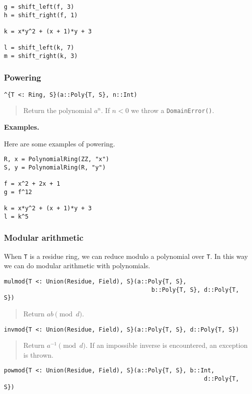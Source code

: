 \documentclass[a4paper,10pt]{article}
\newcommand{\code}{\lstinline}
\newcommand{\desc}[1]{\vspace{-3mm}\begin{quote}#1\end{quote}}
\begin{document}
{{{\begin{lstlisting}
g = shift_left(f, 3)
h = shift_right(f, 1)

k = x*y^2 + (x + 1)*y + 3

l = shift_left(k, 7)
m = shift_right(k, 3)
\end{lstlisting}

\subsubsection{Powering}

\begin{lstlisting}
^{T <: Ring, S}(a::Poly{T, S}, n::Int)
\end{lstlisting}

\desc{Return the polynomial $a^n$. If $n < 0$ we throw a \code{DomainError()}.}

\textbf{Examples.}

Here are some examples of powering.

\begin{lstlisting}
R, x = PolynomialRing(ZZ, "x")
S, y = PolynomialRing(R, "y")

f = x^2 + 2x + 1
g = f^12

k = x*y^2 + (x + 1)*y + 3
l = k^5
\end{lstlisting}

\subsubsection{Modular arithmetic}

When \code{T} is a residue ring, we can reduce modulo a polynomial over
\code{T}. In this way we can do modular arithmetic with polynomials.

\begin{lstlisting}
mulmod{T <: Union(Residue, Field), S}(a::Poly{T, S}, 
                                          b::Poly{T, S}, d::Poly{T, S})
\end{lstlisting}

\desc{Return $ab \pmod{d}$.}

\begin{lstlisting}
invmod{T <: Union(Residue, Field), S}(a::Poly{T, S}, d::Poly{T, S})
\end{lstlisting}

\desc{Return $a^{-1} \pmod{d}$. If an impossible inverse is encountered, an
exception is thrown.}

\begin{lstlisting}
powmod{T <: Union(Residue, Field), S}(a::Poly{T, S}, b::Int, 
                                                         d::Poly{T, S})
\end{lstlisting}

}}}
\end{document}
